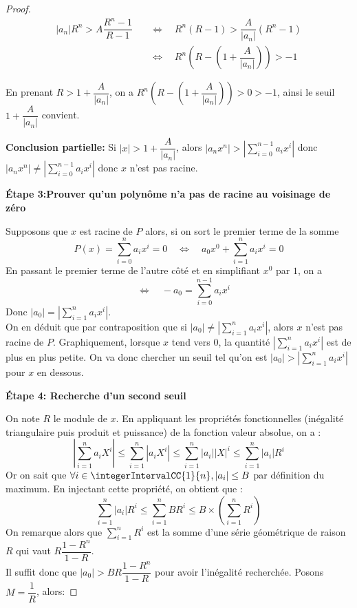 \begin{proof}
\[
\begin{aligned}
|a_n| R^n > A \dfrac{R^{n}-1}{R-1} 
&\quad\Longleftrightarrow\quad 
R^n(R - 1) >\dfrac{A}{|a_n|}(R^n - 1)\\
&\quad\Longleftrightarrow\quad 
R^n\left(R - \left(1 + \dfrac{A}{|a_n|}\right)\right) > -1
\end{aligned}
\]

En prenant $R > 1 + \dfrac{A}{|a_n|}$, on a $R^n\left(R - \left(1 + \dfrac{A}{|a_n|}\right)\right) > 0 > -1$, ainsi le seuil $1 + \dfrac{A}{|a_n|}$ convient. 
\vspace{1.5\baselineskip}

\textbf{Conclusion partielle: } Si $|x|> 1 + \dfrac{A}{|a_n|}$, alors $|a_n x^n| > \left|\displaystyle\sum\limits_{i = 0}^{n-1} a_i x^i \right|$ donc $|a_n x^n| \ne \left|\displaystyle\sum\limits_{i = 0}^{n-1} a_i x^i \right| $ donc $x$ n'est pas racine. 
\vspace{1.5\baselineskip}

\textbf{Étape 3:Prouver qu'un polynôme n'a pas de racine au voisinage de zéro}

Supposons que $x$ est racine de $P$ alors, si on sort le premier terme de la somme
\[
P(x)=\displaystyle\sum\limits_{i = 0}^{n} a_i x^i = 0 \quad\Longleftrightarrow\quad 
a_0 x^0+\displaystyle\sum\limits_{i = 1}^{n} a_i x^i = 0
\]
En passant le premier terme de l'autre côté et en simplifiant $x^0$ par $1$, on a 
\[
\quad\Longleftrightarrow\quad 
- a_0 = \displaystyle\sum\limits_{i = 0}^{n-1} a_i x^i
\]
Donc $|a_0| = \left|\displaystyle\sum\limits_{i = 1}^{n} a_i x^i \right|$. \\
On en déduit que par contraposition que si $|a_0| \ne \left|\displaystyle\sum\limits_{i = 1}^{n} a_i x^i \right|$, alors $x$ n'est pas racine de $P$. Graphiquement, lorsque $x$ tend vers $0$, la quantité $\left|\displaystyle\sum\limits_{i = 1}^{n} a_i x^i \right|$ est de plus en plus petite. On va donc chercher un seuil tel qu'on est $|a_0| > \left|\displaystyle\sum\limits_{i = 1}^{n} a_i x^i \right|$ pour $x$ en dessous. 
\vspace{1.5\baselineskip}

\textbf{Étape 4: Recherche d'un second seuil}

On note $R$ le module de $x$. En appliquant les propriétés fonctionnelles (inégalité triangulaire puis produit et puissance) de la fonction valeur absolue, on a :
\[
\left|\displaystyle\sum\limits_{i = 1}^{n} a_i X^i\right|
\le \displaystyle\sum\limits_{i = 1}^{n} |a_i X^i|
\le \displaystyle\sum\limits_{i = 1}^{n} |a_i| |X|^i
\le \displaystyle\sum\limits_{i = 1}^{n} |a_i| R^i
\]
Or on sait que $\forall i \in \integerIntervalCC{1}{n}, |a_i| \le B$ par définition du maximum. En injectant cette propriété, on obtient que : 
\[
\displaystyle\sum\limits_{i = 1}^{n} |a_i| R^i 
\le \displaystyle\sum\limits_{i = 1}^{n} B R^i 
\le B \times \left( \displaystyle\sum\limits_{i = 1}^{n} R^i \right)
\]
On remarque alors que $\displaystyle\sum\limits_{i = 1}^{n} R^i$ est la somme d'une série géométrique de raison $R$ qui vaut $R\dfrac{1 - R^{n}}{1 - R}$. \\
Il suffit donc que $|a_0| > B R\dfrac{1 - R^n}{1 - R}$ pour avoir l'inégalité recherchée. Posons $M = \dfrac{1}{R}$, alors:


\end{proof}

